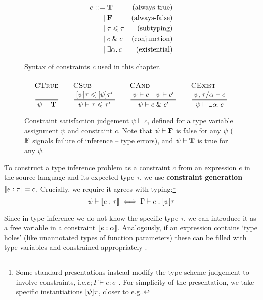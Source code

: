 \begin{figure}
    \centering
    \begin{align*}
        {c} \,::=&\; 
        \mathbf T
        & \text{(always-true)}
        \\ \mid&\;
        \mathbf F
        & \text{(always-false)}
        \\ \mid&\;
        \tau \leqslant \tau 
        & \text{(subtyping)}
        \\ \mid&\;
        c \;\&\; c
         & \text{(conjunction)}
        \\ \mid&\; 
        \exists \alpha \ldotp c
        & \text{(existential)}
    \end{align*}
    \caption{Syntax of constraints $c$ used in this chapter.}
    \label{fig:constraints}
\end{figure}

\begin{figure}
    \centering
    $$
    \irule{CTrue}{}{\psi \vdash \tru}
    \quad
    \irule{CSub}{\substx \psi \tau \sub \substx \psi \tau'}{\psi \vdash \tau \sub \tau'}
    \quad
    \irule{CAnd}{\psi \vdash c \quad \psi \vdash c'}{\psi \vdash c \und c'}
    \quad 
    \irule{CExist}{\psi, \tau/\alpha \vdash c}{\psi \vdash \exists \alpha \ldotp c}
    $$
    \caption{Constraint satisfaction judgement $\psi \vdash c$, defined for a type variable assignment $\psi$ and constraint $c$. Note that $\psi \vdash \mathbf F$ is false for any $\psi$ ($\mathbf F$ signals failure of inference -- type errors), and $\psi \vdash \mathbf T$ is true for any $\psi$.}
    \label{fig:satisfaction}
\end{figure}
 
To construct a type inference problem as a constraint $c$ from an expression $e$ in the source language and its expected type $\tau$, we use \textbf{constraint generation} $\denot{e : \tau} = c$. Crucially, we require it agrees with typing:\footnote{Some standard presentations instead modify the type-scheme judgement to involve constraints, i.e.\@ $c; \Gamma \vdash e : \sigma$ \cite{essence-of-ml-type-inference}. For simplicity of the presentation, we take specific instantiations $\substx \psi \tau$, closer to e.g.\@ \cite[Section 3.4]{constraint-based-freeze-ml}.}
$$ \psi \vdash \denot{e : \tau} \iff \Gamma \vdash e : \substx \psi \tau $$

Since in type inference we do not know the specific type $\tau$, we can introduce it as a free variable in a constraint $\denot{e : \alpha}$. Analogously, if an expression contains `type holes' (like unannotated types of function parameters) these can be filled with type variables and constrained appropriately \cite{tapl}.

